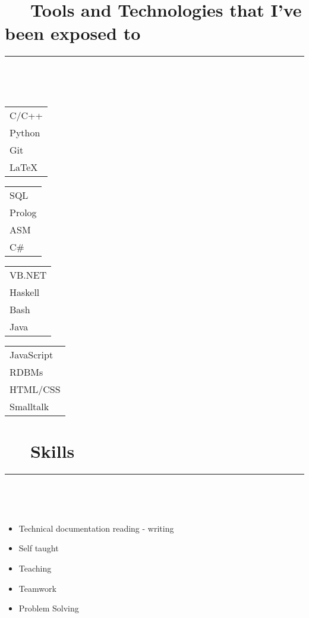 \documentclass{article}
\begin{document}
\section*{\faCogs ~~ Tools and Technologies that I've been exposed to} 
\hrule
\

\
    
\begin{multicols}{4}
    \begin{tabular}{l}
        C/C++ \\
        Python \\
        Git \\
        LaTeX
    \end{tabular}

    \begin{tabular}{l}
        SQL \\
        Prolog \\
        ASM \\
        C\#
    \end{tabular}
    
    \begin{tabular}{l}
        VB.NET \\
        Haskell \\
        Bash \\
        Java
    \end{tabular}
    
    \begin{tabular}{l}
        JavaScript \\
        RDBMs \\
        HTML/CSS \\
        Smalltalk
    \end{tabular}
   
\end{multicols}

\newpage

\section*{\faCoffee ~~ Skills} 
\hrule
\

\

\begin{multicols}{2}
    \begin{itemize}
        \item Technical documentation reading - writing
        \item Self taught
        \item Teaching
        \item Teamwork
        \item Problem Solving
    \end{itemize}
\end{multicols}
\end{document}

